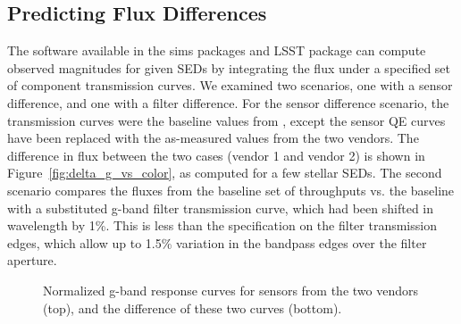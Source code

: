 \documentclass[DM,toc]{lsstdoc}
\begin{document}
\subsection{Predicting Flux Differences}

The software available in the sims packages and LSST  package
can compute observed magnitudes for given SEDs by integrating the flux under a
specified set of component transmission curves. We examined two scenarios, one
with a sensor difference, and one with a filter difference. For the sensor
difference scenario, the transmission curves were the baseline values from
, except the sensor QE curves have been replaced with the
as-measured values from the two vendors. The difference in flux between the two
cases (vendor 1 and vendor 2) is shown in Figure~\ref{fig:delta_g_vs_color}, as
computed for a few stellar SEDs. The second scenario compares the fluxes from
the baseline set of throughputs vs. the baseline with a substituted g-band
filter transmission curve, which had been shifted in wavelength by 1\%. This is
less than the specification on the filter transmission
edges\nocite{LSE-30},
which allow up to 1.5\% variation
in the bandpass edges over the filter aperture.

\begin{figure}
\caption{Normalized g-band response curves for sensors from the two vendors
(top), and the difference of these two curves (bottom).
\label{fig:QE_response_curves}
}
\end{figure}
\end{document}

